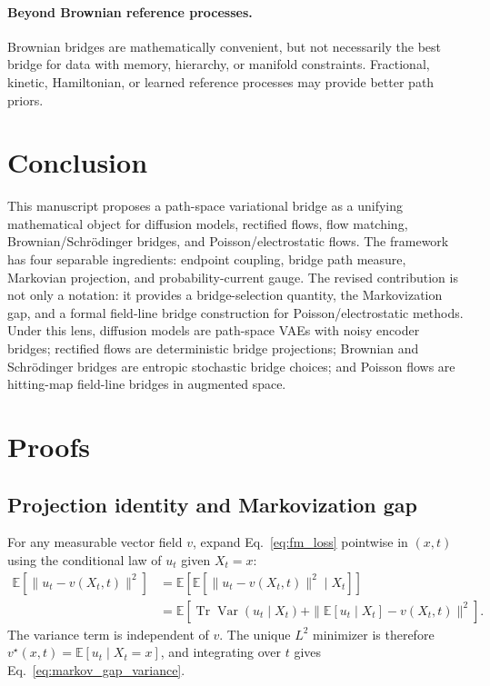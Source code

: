 \documentclass[twoside,11pt]{jmlr}
\numberwithin{equation}{section}
\newcommand{\E}{\mathbb{E}}
\newcommand{\Var}{\operatorname{Var}}
\newcommand{\Tr}{\operatorname{Tr}}
\begin{document}
\paragraph{Beyond Brownian reference processes.}
Brownian bridges are mathematically convenient, but not necessarily the best bridge for data with memory, hierarchy, or manifold constraints. Fractional, kinetic, Hamiltonian, or learned reference processes may provide better path priors.

\section{Conclusion}

This manuscript proposes a path-space variational bridge as a unifying mathematical object for diffusion models, rectified flows, flow matching, Brownian/Schr\"odinger bridges, and Poisson/electrostatic flows. The framework has four separable ingredients: endpoint coupling, bridge path measure, Markovian projection, and probability-current gauge. The revised contribution is not only a notation: it provides a bridge-selection quantity, the Markovization gap, and a formal field-line bridge construction for Poisson/electrostatic methods. Under this lens, diffusion models are path-space VAEs with noisy encoder bridges; rectified flows are deterministic bridge projections; Brownian and Schr\"odinger bridges are entropic stochastic bridge choices; and Poisson flows are hitting-map field-line bridges in augmented space.

\appendix

\section{Proofs}

\subsection{Projection identity and Markovization gap}

For any measurable vector field $v$, expand Eq.~\eqref{eq:fm_loss} pointwise in $(x,t)$ using the conditional law of $u_t$ given $X_t=x$:
\begin{align}
    \E[\|u_t-v(X_t,t)\|^2]
    &=\E\left[\E[\|u_t-v(X_t,t)\|^2\mid X_t]\right]\\
    &=\E\left[\Tr\Var(u_t\mid X_t)+\|\E[u_t\mid X_t]-v(X_t,t)\|^2\right].
\end{align}
The variance term is independent of $v$. The unique $L^2$ minimizer is therefore $v^\star(x,t)=\E[u_t\mid X_t=x]$, and integrating over $t$ gives Eq.~\eqref{eq:markov_gap_variance}.
\end{document}
